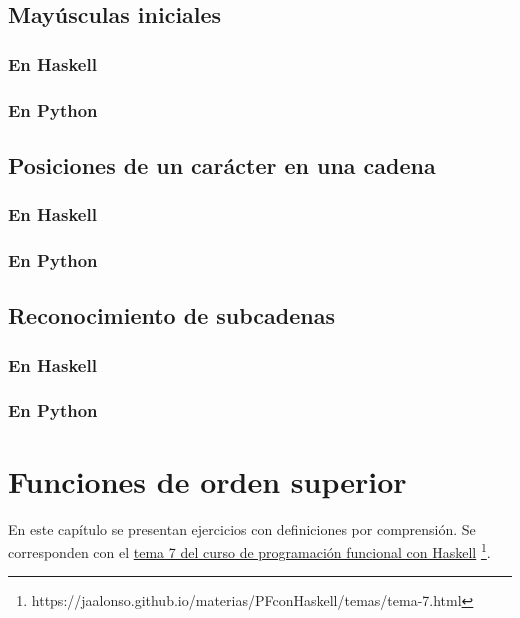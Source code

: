 \documentclass[a4paper,12pt,twoside]{book}
\begin{document}
\section{Mayúsculas iniciales}
\subsection*{En Haskell}
\subsection*{En Python}

\section{Posiciones de un carácter en una cadena}
\subsection*{En Haskell}
\subsection*{En Python}

\section{Reconocimiento de subcadenas}
\subsection*{En Haskell}
\subsection*{En Python}

\chapter{Funciones de orden superior}

En este capítulo se presentan ejercicios con definiciones por
comprensión. Se corresponden con el
\href{https://jaalonso.github.io/materias/PFconHaskell/temas/tema-7.html}
{tema 7 del curso de programación funcional con Haskell}
\footnote{https://jaalonso.github.io/materias/PFconHaskell/temas/tema-7.html}.
\end{document}
